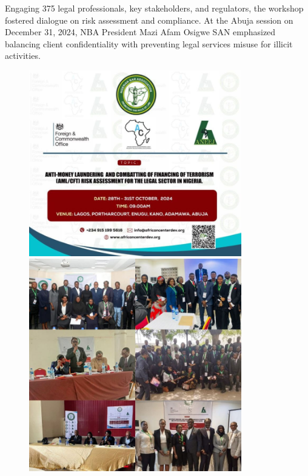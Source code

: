 \documentclass[
  letterpaper,
  DIV=11,
  numbers=noendperiod]{scrreprt}
\begin{document}
Engaging 375 legal professionals, key stakeholders, and regulators, the
workshop fostered dialogue on risk assessment and compliance. At the
Abuja session on December 31, 2024, NBA President Mazi Afam Osigwe SAN
emphasized balancing client confidentiality with preventing legal
services misuse for illicit activities.

\begin{figure}

\begin{minipage}{0.50\linewidth}
\includegraphics[width=3.64583in,height=\textheight,keepaspectratio]{images/strengthen/14_0_risk.png}\end{minipage}%
%
\begin{minipage}{0.50\linewidth}
\includegraphics[width=3.64583in,height=\textheight,keepaspectratio]{images/strengthen/14_1_risk.png}\end{minipage}%

\end{figure}%
\end{document}
